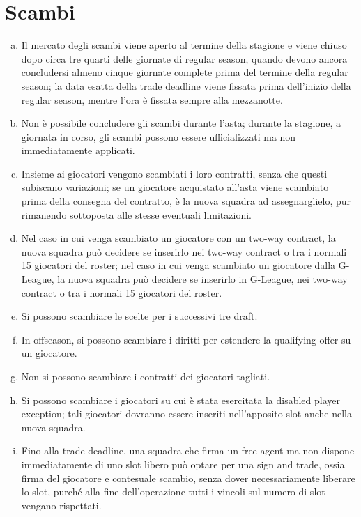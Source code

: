 \documentclass{article}
\begin{document}
\section{Scambi}\label{Scambi}
\begin{enumerate}[(a)]
\item Il mercato degli scambi viene aperto al termine della stagione e viene chiuso dopo circa tre quarti delle giornate di regular season, quando devono ancora concludersi almeno cinque giornate complete prima del termine della regular season; la data esatta della trade deadline viene fissata prima dell'inizio della regular season, mentre l'ora è fissata sempre alla mezzanotte.
\item Non è possibile concludere gli scambi durante l'asta; durante la stagione, a giornata in corso, gli scambi possono essere ufficializzati ma non immediatamente applicati.
\item Insieme ai giocatori vengono scambiati i loro contratti, senza che questi subiscano variazioni; se un giocatore acquistato all'asta viene scambiato prima della consegna del contratto, è la nuova squadra ad assegnarglielo, pur rimanendo sottoposta alle stesse eventuali limitazioni.
\item Nel caso in cui venga scambiato un giocatore con un two-way contract, la nuova squadra può decidere se inserirlo nei two-way contract o tra i normali 15 giocatori del roster; nel caso in cui venga scambiato un giocatore dalla G-League, la nuova squadra può decidere se inserirlo in G-League, nei two-way contract o tra i normali 15 giocatori del roster.
\item Si possono scambiare le scelte per i successivi tre draft.
\item In offseason, si possono scambiare i diritti per estendere la qualifying offer su un giocatore.
\item Non si possono scambiare i contratti dei giocatori tagliati.
\item Si possono scambiare i giocatori su cui è stata esercitata la disabled player exception; tali giocatori dovranno essere inseriti nell'apposito slot anche nella nuova squadra.
\item Fino alla trade deadline, una squadra che firma un free agent ma non dispone immediatamente di uno slot libero può optare per una sign and trade, ossia firma del giocatore e contesuale scambio, senza dover necessariamente liberare lo slot, purché alla fine dell'operazione tutti i vincoli sul numero di slot vengano rispettati.
\end{enumerate}
\end{document}
